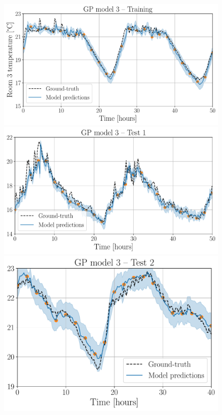 {\begin{landscape}
\begin{figure}[!t]
	\includegraphics[scale=0.29]{../images/chap3_room_3_temp_model_train.pdf} 
	\includegraphics[scale=0.29]{../images/chap3_room_3_temp_model_test1.pdf}
	\includegraphics[scale=0.29]{../images/chap3_room_3_temp_model_test2.pdf}
	\caption{
}
\end{figure}
\end{landscape}}
